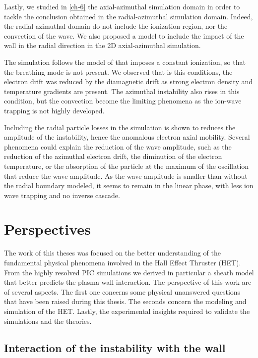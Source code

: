 Lastly, we studied in \cref{ch-6} the axial-azimuthal simulation domain in order to tackle the conclusion obtained in the radial-azimuthal simulation domain.
Indeed, the radial-azimuthal domain do not include the ionization region, nor the convection of the wave.
We also proposed a model to include the impact of the wall in the radial direction in the 2D axial-azimuthal simulation.

The simulation follows the model of \citet{boeuf2018} that imposes a constant ionization, so that the breathing mode is not present.
We observed that is this conditions, the electron drift was reduced by the diamagnetic drift as strong electron density and temperature gradients are present.
The azimuthal instability also rises in this condition, but the convection become the limiting phenomena as the ion-wave trapping is not highly developed.

Including the radial particle losses in the simulation is shown to reduces the amplitude of the instability, hence the anomalous electron axial mobility.
Several phenomena could explain the reduction of the wave amplitude, such as the reduction of the azimuthal electron drift, the diminution of the electron temperature, or the absorption of the particle at the maximum of the oscillation that reduce the wave amplitude.
As the wave amplitude is smaller than without the radial boundary modeled, it seems to remain in the linear phase, with less ion wave trapping and no inverse cascade.

\section{Perspectives}

The work of this theses was focused on the better understanding of the fundamental physical phenomena involved in the Hall Effect Thruster (HET).
From the highly resolved PIC simulations we derived in particular a sheath model that better predicts the plasma-wall interaction.
The perspective of this work are of several aspects.
The first one concerns some physical unanswered questions that have been raised during this thesis.
The seconds concern the modeling and simulation of the HET.
Lastly, the experimental insights required to validate the simulations and the theories.

\subsection{Interaction of the instability with the wall}

